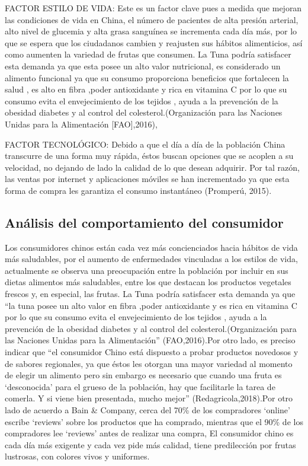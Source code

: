 \documentclass[
  stu,
  floatsintext,
  longtable,
  a4paper,
  nolmodern,
  notxfonts,
  notimes,
  colorlinks=true,linkcolor=blue,citecolor=blue,urlcolor=blue]{apa7}
\begin{document}
FACTOR ESTILO DE VIDA: Este es un factor clave pues a medida que mejoran
las condiciones de vida en China, el número de pacientes de alta presión
arterial, alto nivel de glucemia y alta grasa sanguínea se incrementa
cada día más, por lo que se espera que los ciudadanos cambien y
reajusten sus hábitos alimenticios, así como aumenten la variedad de
frutas que consumen. La Tuna podría satisfacer esta demanda ya que esta
posee un alto valor nutricional, es considerado un alimento funcional ya
que su consumo proporciona beneficios que fortalecen la salud , es alto
en fibra ,poder antioxidante y rica en vitamina C por lo que su consumo
evita el envejecimiento de los tejidos , ayuda a la prevención de la
obesidad diabetes y al control del colesterol.(Organización para las
Naciones Unidas para la Alimentación {[}FAO{]},2016),

FACTOR TECNOLÓGICO: Debido a que el día a día de la población China
transcurre de una forma muy rápida, éstos buscan opciones que se acoplen
a su velocidad, no dejando de lado la calidad de lo que desean adquirir.
Por tal razón, las ventas por internet y aplicaciones móviles se han
incrementado ya que esta forma de compra les garantiza el consumo
instantáneo (Promperú, 2015).

\subsection{Análisis del comportamiento del
consumidor}\label{anuxe1lisis-del-comportamiento-del-consumidor}

Los consumidores chinos están cada vez más concienciados hacia hábitos
de vida más saludables, por el aumento de enfermedades vinculadas a los
estilos de vida, actualmente se observa una preocupación entre la
población por incluir en sus dietas alimentos más saludables, entre los
que destacan los productos vegetales frescos y, en especial, las frutas.
La Tuna podría satisfacer esta demanda ya que ``la tuna posee un alto
valor en fibra ,poder antioxidante y es rica en vitamina C por lo que su
consumo evita el envejecimiento de los tejidos , ayuda a la prevención
de la obesidad diabetes y al control del colesterol.(Organización para
las Naciones Unidas para la Alimentación'' (FAO,2016).Por otro lado, es
preciso indicar que ``el consumidor Chino está dispuesto a probar
productos novedosos y de sabores regionales, ya que éstos les otorgan
una mayor variedad al momento de elegir un alimento pero sin embargo es
necesario que cuando una fruta es `desconocida' para el grueso de la
población, hay que facilitarle la tarea de comerla. Y si viene bien
presentada, mucho mejor'' (Redagricola,2018).Por otro lado de acuerdo a
Bain \& Company, cerca del 70\% de los compradores `online' escribe
`reviews' sobre los productos que ha comprado, mientras que el 90\% de
los compradores lee `reviews' antes de realizar una compra, El
consumidor chino es cada día más exigente y cada vez pide más calidad,
tiene predilección por frutas lustrosas, con colores vivos y uniformes.
\end{document}
